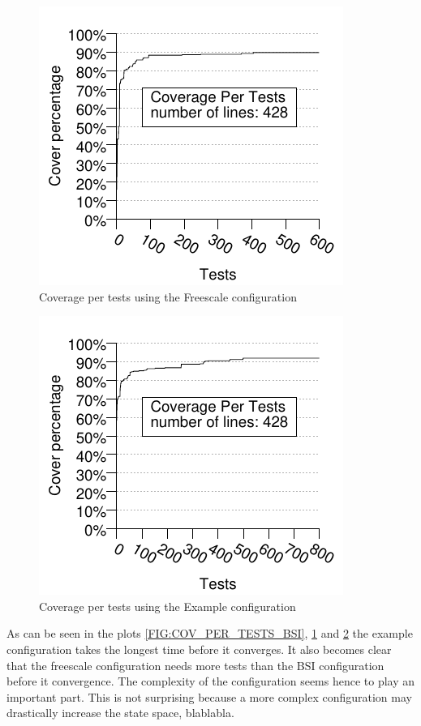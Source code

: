 \begin{figure}[!ht]
\begin{center}
\includegraphics{generated_pictures/coverage_per_tests_freescale.pdf}
\end{center}
\caption{Coverage per tests using the Freescale configuration}
\label{FIG:COV_PER_TESTS_FREESCALE}
\end{figure}


\begin{figure}[!ht]
\begin{center}
\includegraphics{generated_pictures/coverage_per_tests_example.pdf}
\end{center}
\caption{Coverage per tests using the Example configuration}
\label{FIG:COV_PER_TESTS_EXAMPLE}
\end{figure}

As can be seen in the plots \ref{FIG:COV_PER_TESTS_BSI},
\ref{FIG:COV_PER_TESTS_FREESCALE} and \ref{FIG:COV_PER_TESTS_EXAMPLE} the
example configuration takes the longest time before it converges. It also
becomes clear that the freescale configuration needs more tests than the BSI
configuration before it convergence. The complexity of the configuration seems
hence to play an important part. This is not surprising because a more complex
configuration may drastically increase the state space, blablabla.

